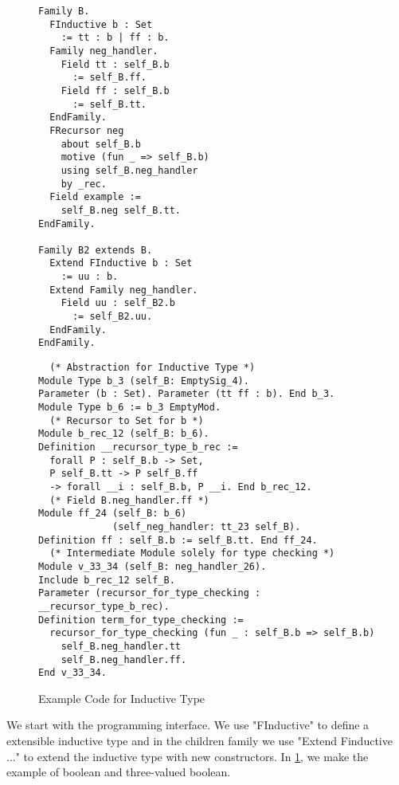 \begin{figure}[!htb]
  \begin{minipage}[t]{0.32\linewidth}
\begin{verbatim}
Family B.
  FInductive b : Set 
    := tt : b | ff : b.
  Family neg_handler. 
    Field tt : self_B.b 
      := self_B.ff.
    Field ff : self_B.b 
      := self_B.tt.
  EndFamily.
  FRecursor neg 
    about self_B.b 
    motive (fun _ => self_B.b)
    using self_B.neg_handler
    by _rec.
  Field example := 
    self_B.neg self_B.tt. 
EndFamily.

Family B2 extends B.
  Extend FInductive b : Set 
    := uu : b.
  Extend Family neg_handler.
    Field uu : self_B2.b 
      := self_B2.uu.
  EndFamily. 
EndFamily.
\end{verbatim}
  \end{minipage}
  \begin{minipage}[t]{0.65\linewidth}
\begin{verbatim}
  (* Abstraction for Inductive Type *)
Module Type b_3 (self_B: EmptySig_4).
Parameter (b : Set). Parameter (tt ff : b). End b_3.      
Module Type b_6 := b_3 EmptyMod.
  (* Recursor to Set for b *)
Module b_rec_12 (self_B: b_6).
Definition __recursor_type_b_rec :=
  forall P : self_B.b -> Set,
  P self_B.tt -> P self_B.ff 
  -> forall __i : self_B.b, P __i. End b_rec_12. 
  (* Field B.neg_handler.ff *)
Module ff_24 (self_B: b_6) 
             (self_neg_handler: tt_23 self_B).
Definition ff : self_B.b := self_B.tt. End ff_24.
  (* Intermediate Module solely for type checking *)
Module v_33_34 (self_B: neg_handler_26).
Include b_rec_12 self_B.
Parameter (recursor_for_type_checking : __recursor_type_b_rec).
Definition term_for_type_checking :=
  recursor_for_type_checking (fun _ : self_B.b => self_B.b)
    self_B.neg_handler.tt
    self_B.neg_handler.ff.  
End v_33_34.
\end{verbatim}
  \end{minipage}
\caption{Example Code for Inductive Type}\label{fig:plugin-example2}
\end{figure}



We start with the programming interface. We use "FInductive" to define a extensible inductive type and in the children family we use "Extend Finductive ..." to extend the inductive type with new constructors. In \cref{fig:plugin-example2}, we make the example of boolean and three-valued boolean. 



